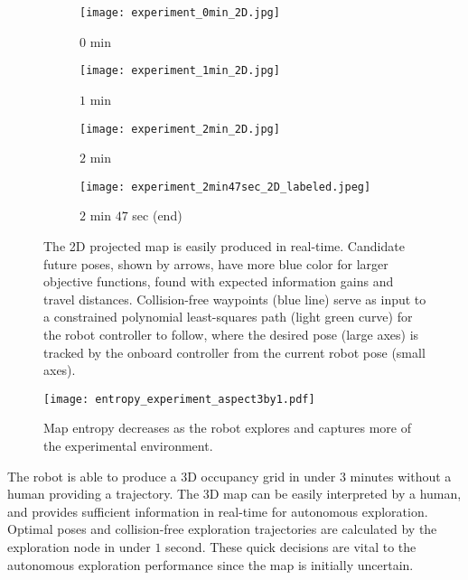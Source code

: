 \begin{figure}[!t]
\centering
    	\begin{subfigure}[t]{0.44\columnwidth}
           	\centering
          	\texttt{[image: experiment\_0min\_2D.jpg]}
        		\caption{$0$ min}
    	\end{subfigure}
    	\begin{subfigure}[t]{0.44\columnwidth}
           	\centering
          	\texttt{[image: experiment\_1min\_2D.jpg]}
        		\caption{$1$ min}
    	\end{subfigure}
    	\begin{subfigure}[t]{0.44\columnwidth}
           	\centering
          	\texttt{[image: experiment\_2min\_2D.jpg]}
        		\caption{$2$ min}
    	\end{subfigure}
    	\begin{subfigure}[t]{0.44\columnwidth}
           	\centering
          	\texttt{[image: experiment\_2min47sec\_2D\_labeled.jpeg]}
        		\caption{$2$ min $47$ sec (end)}
    	\end{subfigure}
	\caption{The 2D projected map is easily produced in real-time. Candidate future poses, shown by arrows, have more blue color for larger objective functions, found with expected information gains and travel distances. Collision-free waypoints (blue line) serve as input to a constrained polynomial least-squares path (light green curve) for the robot controller to follow, where the desired pose (large axes) is tracked by the onboard controller from the current robot pose (small axes).}
	\label{fig:exp2DMap}
\end{figure}

\begin{figure}[!t]
	\centering
	\texttt{[image: entropy\_experiment\_aspect3by1.pdf]}
	\caption{Map entropy decreases as the robot explores and captures more of the experimental environment.}
	\label{fig:expH}
\end{figure}

The robot is able to produce a 3D occupancy grid in under $3$ minutes without a human providing a trajectory. The 3D map can be easily interpreted by a human, and provides sufficient information in real-time for autonomous exploration. Optimal poses and collision-free exploration trajectories are calculated by the exploration node in under $1$ second. These quick decisions are vital to the autonomous exploration performance since the map is initially uncertain.

